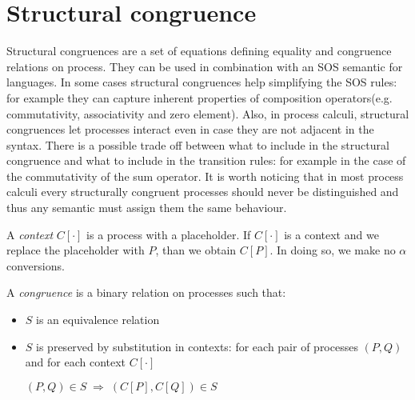 \section{Structural congruence}

Structural congruences are a set of equations defining equality and congruence relations on process. They can be used in combination with an SOS semantic for languages. In some cases structural congruences help simplifying the SOS rules: for example they can capture inherent properties of composition operators(e.g. commutativity, associativity and zero element). Also, in process calculi, structural congruences let processes interact even in case they are not adjacent in the syntax. There is a possible trade off between what to include in the structural congruence and what to include in the transition rules: for example in the case of the commutativity of the sum operator. It is worth noticing that in most process calculi every structurally congruent processes should never be distinguished and thus any semantic must assign them the same behaviour.

\begin{definition}
  A \emph{context} $C[\cdot]$ is a process with a placeholder. If $C[\cdot]$ is a context and we replace the placeholder with $P$, than we obtain $C[P]$. In doing so, we make no $\alpha$ conversions.
\end{definition}


\begin{definition}
  A \emph{congruence} is a binary relation on processes such that:
  \begin{itemize}
    \item 
      $S$ is an equivalence relation
    \item 
      $S$ is preserved by substitution in contexts: for each pair of processes $(P, Q)$ and for each context $C[\cdot]$
      \begin{center}
	$(P,Q)\in S\; \Rightarrow\; (C[P], C[Q])\in S$
      \end{center}
  \end{itemize}
\end{definition}


